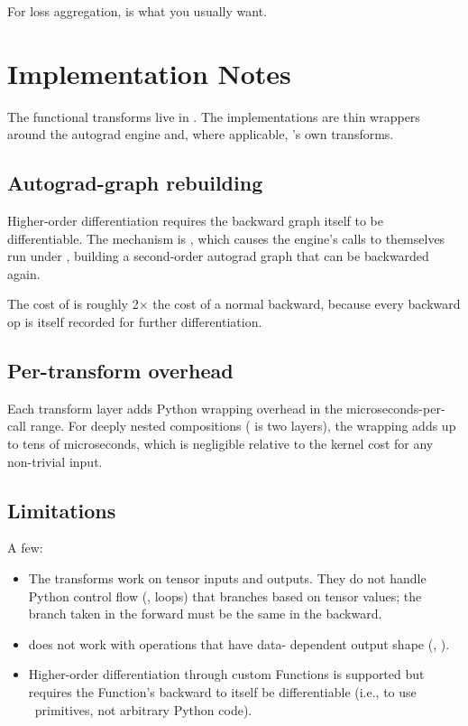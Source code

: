 For loss aggregation,  is what you usually
want.

\section{Implementation Notes}
\label{sec:higher_order:impl}

The functional transforms live in . The
implementations are thin wrappers around the autograd engine and,
where applicable, \MLX's own transforms.

\subsection{Autograd-graph rebuilding}
\label{ssec:higher_order:rebuild}

Higher-order differentiation requires the backward graph itself
to be differentiable. The mechanism is
, which causes the engine's
 calls to themselves run under ,
building a second-order autograd graph that can be backwarded
again.

The cost of  is roughly 2$\times$ the
cost of a normal backward, because every backward op is itself
recorded for further differentiation.

\subsection{Per-transform overhead}
\label{ssec:higher_order:per_transform}

Each transform layer adds Python wrapping overhead in the
microseconds-per-call range. For deeply nested compositions
( is two layers), the wrapping adds up to tens of
microseconds, which is negligible relative to the kernel cost
for any non-trivial input.

\subsection{Limitations}
\label{ssec:higher_order:limitations}

A few:

\begin{itemize}
  \item The transforms work on tensor inputs and outputs. They do
    not handle Python control flow (, 
    loops) that branches based on tensor values; the branch
    taken in the forward must be the same in the backward.
  \item {} does not work with operations that have data-
    dependent output shape (, ).
  \item Higher-order differentiation through custom Functions is
    supported but requires the Function's backward to itself be
    differentiable (i.e., to use \Lucid\ primitives, not
    arbitrary Python code).
\end{itemize}

